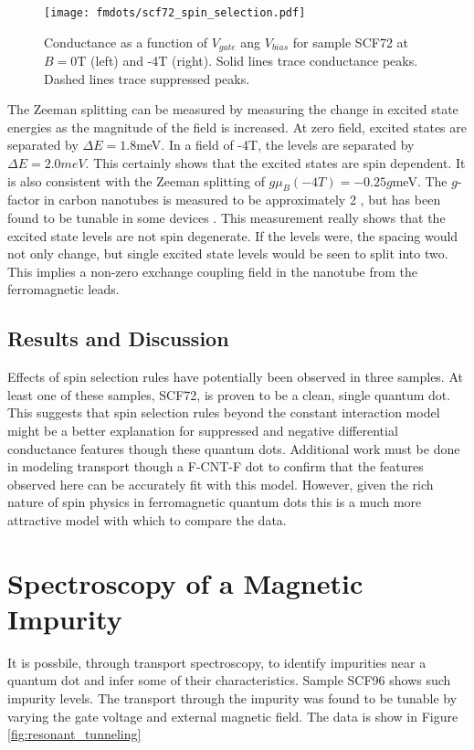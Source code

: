 \begin{figure}
    \centering
    \texttt{[image: fmdots/scf72\_spin\_selection.pdf]}
    \caption{Conductance as a function of $V_{gate}$ ang $V_{bias}$ for sample SCF72 at $B=0$T (left) and -4T (right). Solid lines trace conductance peaks. Dashed lines trace suppressed peaks.}
    \label{fig:scf72_spin_selection}
\end{figure}

The Zeeman splitting can be measured by measuring the change in excited state energies as the magnitude of the field is increased. At zero field, excited states are separated by $\Delta E = 1.8$meV. In a field of -4T, the levels are separated by $\Delta E = 2.0meV$. This certainly shows that the excited states are spin dependent. It is also consistent with the Zeeman splitting of $g \mu_B (-4T) =-0.25 g$meV. The $g$-factor in carbon nanotubes is measured to be approximately 2 \cite{Cobden1998}, but has been found to be tunable in some devices \cite{Lai2014}. This measurement really shows that the excited state levels are not spin degenerate. If the levels were, the spacing would not only change, but single excited state levels would be seen to split into two. This implies a non-zero exchange coupling field in the nanotube from the ferromagnetic leads.

\subsection{Results and Discussion}

Effects of spin selection rules have potentially been observed in three samples. At least one of these samples, SCF72, is proven to be a clean, single quantum dot. This suggests that spin selection rules beyond the constant interaction model might be a better explanation for suppressed and negative differential conductance features though these quantum dots. Additional work must be done in modeling transport though a F-CNT-F dot to confirm that the features observed here can be accurately fit with this model. However, given the rich nature of spin physics in ferromagnetic quantum dots this is a much more attractive model with which to compare the data.

\section{Spectroscopy of a Magnetic Impurity}
\label{sec:imurity_tunneling}

It is possbile, through transport spectroscopy, to identify impurities near a quantum dot and infer some of their characteristics. Sample SCF96 shows such impurity levels. The transport through the impurity was found to be tunable by varying the gate voltage and external magnetic field. The data is show in Figure \ref{fig:resonant_tunneling}


